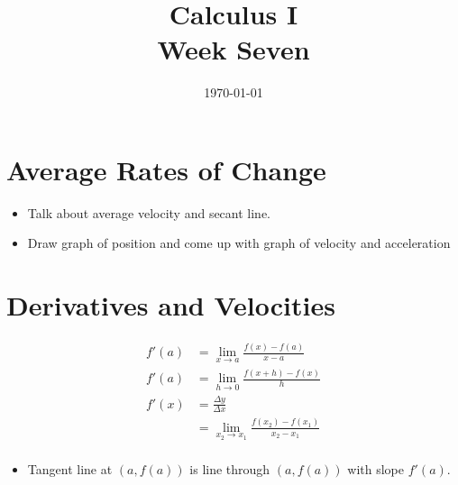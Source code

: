 \documentclass[letterpaper, landscape]{exam}
\author{}
\date{\today}
\title{Calculus I \\ Week Seven}
\begin{document}
  \maketitle
  \tableofcontents

  \section{Average Rates of Change}
  \begin{itemize}
    \item Talk about average velocity and secant line.
    \item Draw graph of position and come up with graph of velocity and acceleration
  \end{itemize}

  \section{Derivatives and Velocities}

  \begin{align*}
    f'(a) & = \lim_{x \to a} \frac{f(x) - f(a)}{x - a} \\
    f'(a) & = \lim_{h \to 0} \frac{f(x + h) - f(x)}{h} \\
    f'(x) & = \frac{\Delta y}{\Delta x} \\
          & = \lim_{x_2 \to x_1} \frac{f(x_2) - f(x_1)}{x_2 - x_1} \\
  \end{align*}

  \begin{itemize}
    \item Tangent line at $(a, f(a))$ is line through $(a, f(a))$ with slope $f'(a)$.
  \end{itemize}
\end{document}
